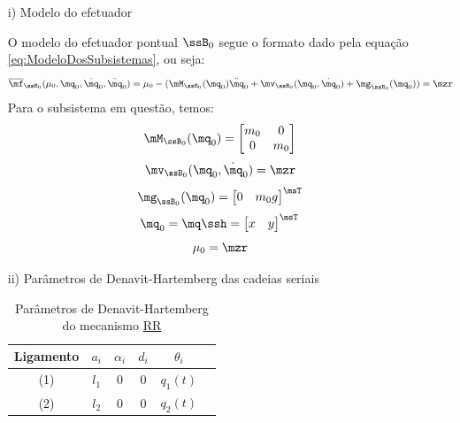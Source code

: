 \documentclass[]{politex}
\begin{document}
\begin{itemize}
\item[i)] Modelo do efetuador

O modelo do efetuador pontual $\ssB_0$ segue o formato dado pela equação \eqref{eq:ModeloDosSubsistemas}, ou seja:
\begin{equation}
\overline{\mf}_{\ssB_0}(\mu_0, \mq_0, \dot{\mq}_0, \ddot{\mq}_0) =  \mu_0 - (\mM_{\ssB_0}(\mq_0) \ddot{\mq}_0 + \mv_{\ssB_0}(\mq_0,\dot{\mq}_0) + \mg_{\ssB_0}(\mq_0)) = \mzr
\end{equation}
Para o subsistema em questão, temos:
\begin{equation}
\mM_{\ssB_0}(\mq_0) = \begin{bmatrix}
m_0 & 0 \\
0 & m_0 \\
\end{bmatrix}
\end{equation}
\begin{equation}
\mv_{\ssB_0}(\mq_0,\dot{\mq}_0) = \mzr
\end{equation}
\begin{equation}
\mg_{\ssB_0}(\mq_0) = \begin{bmatrix}
0 &
m_0 g \\
\end{bmatrix}^\msT
\end{equation}
\begin{equation}
\mq_0 = \mq\ssh = \begin{bmatrix}
x &
y
\end{bmatrix}^\msT
\end{equation}
\begin{equation}
\mu_0 = \mzr
\end{equation}



\item[ii)] Parâmetros de Denavit-Hartemberg das cadeias seriais

\begin{table}[h]
\begin{center}
\caption[DH]{Parâmetros de Denavit-Hartemberg do mecanismo \underline{R}\underline{R}}
\begin{tabular}{|c|c|c|c|c|c|} 
	\hline
	\rule[-2mm]{0mm}{6mm}
	Ligamento & $a_i$ & $\alpha_i$ & $d_i$ & $\theta_i$ \\
	\hline
	\rule[-2mm]{0mm}{6mm}
	(1) & $l_1$ & $0$ & $0$ & $q_1(t)$  \\
	\rule[-1mm]{0mm}{5mm}
	(2) & $l_2$ & $0$ & $0$ & $q_2(t)$  \\
	\hline
\end{tabular}
\label{tab:DH}
\end{center}
\end{table}


\end{itemize}
\end{document}
